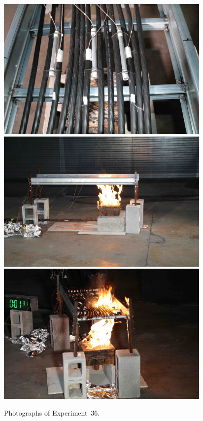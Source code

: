 \documentclass[12pt]{article}
\begin{document}
\begin{figure}[p]
\centering
\includegraphics[height=2.75in]{../FIGURES/Test_36_setup} \\
\includegraphics[height=2.75in]{../FIGURES/Test_36_side} \\
\includegraphics[height=2.75in]{../FIGURES/Test_36_1_min_31_s}
\caption[Photographs of Experiment~36]{Photographs of Experiment~36.}
\label{fig:Test_36_photos}
\end{figure}


\clearpage
\end{document}
